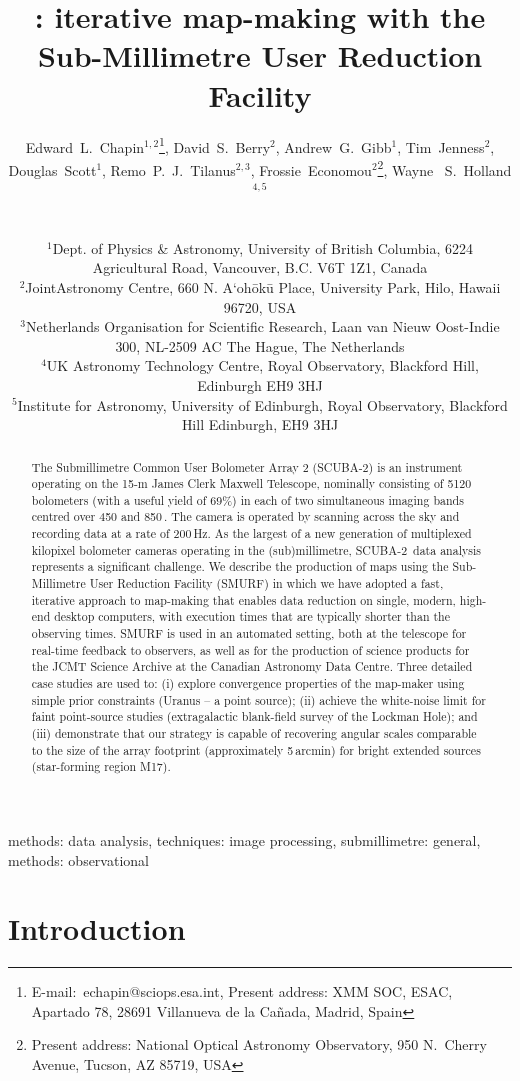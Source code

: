\documentclass[useAMS,usenatbib,nofootinbib]{mn2e}
\title[\scuba: iterative map-making with SMURF]{\scuba: iterative map-making
with the Sub-Millimetre User Reduction Facility}
\author[Edward~L.~Chapin~et~al.]{
  \parbox[t]{\textwidth}{
    Edward~L.~Chapin$^{1,2}$\thanks{E-mail:~echapin@sciops.esa.int,
      Present address: XMM SOC, ESAC, Apartado 78, 28691 Villanueva de
      la Ca\~nada, Madrid, Spain},
    David~S.~Berry$^{2}$,
    Andrew~G.~Gibb$^{1}$,
    Tim~Jenness$^{2}$,
    Douglas~Scott$^{1}$,
    Remo~P.~J.~Tilanus$^{2,3}$,
    Frossie~Economou$^2$\thanks{Present address: National Optical
      Astronomy Observatory, 950 N.\ Cherry Avenue, Tucson, AZ 85719,
      USA},
    Wayne ~S.~Holland$^{4,5}$
  }
  \\
  \\
  $^{1}$Dept. of Physics \& Astronomy, University of British Columbia,
  6224 Agricultural Road, Vancouver, B.C. V6T 1Z1, Canada\\
  $^{2}$JointAstronomy Centre, 660 N. A`oh\={o}k\={u} Place, University
  Park, Hilo, Hawaii 96720, USA\\
  $^{3}$Netherlands Organisation for Scientific Research,
  Laan van Nieuw Oost-Indie 300, NL-2509 AC The Hague, The Netherlands\\
  $^{4}$UK Astronomy Technology Centre, Royal Observatory, Blackford
  Hill, Edinburgh EH9 3HJ\\
  $^{5}$Institute for Astronomy, University of Edinburgh, Royal
  Observatory, Blackford Hill Edinburgh, EH9 3HJ}
\newcommand{\scuba}{SCUBA-2}
\begin{document}
\label{firstpage}

\maketitle

\begin{abstract}
  The Submillimetre Common User Bolometer Array 2 (\scuba) is an
  instrument operating on the 15-m James Clerk Maxwell Telescope,
  nominally consisting of 5120 bolometers (with a useful yield of
  69\%) in each of two simultaneous imaging bands centred over 450 and
  850\,\micron. The camera is operated by scanning across the sky and
  recording data at a rate of 200\,Hz. As the largest of a new
  generation of multiplexed kilopixel bolometer cameras operating in
  the (sub)millimetre, \scuba\ data analysis represents a significant
  challenge.  We describe the production of maps using the
  Sub-Millimetre User Reduction Facility (SMURF) in which we have
  adopted a fast, iterative approach to map-making that enables data
  reduction on single, modern, high-end desktop computers, with
  execution times that are typically shorter than the observing times.
  SMURF is used in an automated setting, both at the telescope for
  real-time feedback to observers, as well as for the production of
  science products for the JCMT Science Archive at the Canadian
  Astronomy Data Centre. Three detailed case studies are used to: (i)
  explore convergence properties of the map-maker using simple prior
  constraints (Uranus -- a point source); (ii) achieve the white-noise
  limit for faint point-source studies (extragalactic blank-field
  survey of the Lockman Hole); and (iii) demonstrate that our strategy
  is capable of recovering angular scales comparable to the size of
  the array footprint (approximately 5\,arcmin) for bright extended
  sources (star-forming region M17).
\end{abstract}


\begin{keywords}
methods: data analysis, techniques: image processing, submillimetre:
general, methods: observational
\end{keywords}

\section{Introduction}
\label{sec:intro}
\end{document}
